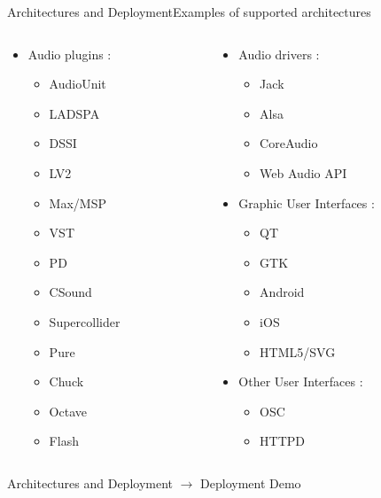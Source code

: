 \begin{frame}[shrink=10]{Architectures and Deployment}{Examples of supported architectures}
\begin{columns}[t]

\begin{column}{0.45\textwidth}
	\begin{itemize}
		\item Audio plugins :
		\begin{itemize}
			\item AudioUnit
			\item LADSPA
			\item DSSI
			\item LV2
			\item Max/MSP
			\item VST
			\item PD
			\item CSound
			\item Supercollider
			\item Pure
			\item Chuck
			\item Octave
			\item Flash
		\end{itemize}
	\end{itemize}
\end{column}

\begin{column}{0.45\textwidth}
		\begin{itemize}
			\item Audio drivers :
			\begin{itemize}
				\item Jack
				\item Alsa
				\item CoreAudio
				\item Web Audio API
			\end{itemize}
			\item Graphic User Interfaces :
			\begin{itemize}
				\item QT
				\item GTK
				\item Android
				\item iOS
				\item HTML5/SVG
			\end{itemize}
			\item Other User Interfaces :
			\begin{itemize}
				\item OSC
				\item HTTPD
			\end{itemize}
		\end{itemize}
\end{column}
\end{columns}
\end{frame}

\begin{frame}{Architectures and Deployment}
	\Large $\rightarrow$ Deployment Demo
\end{frame}

